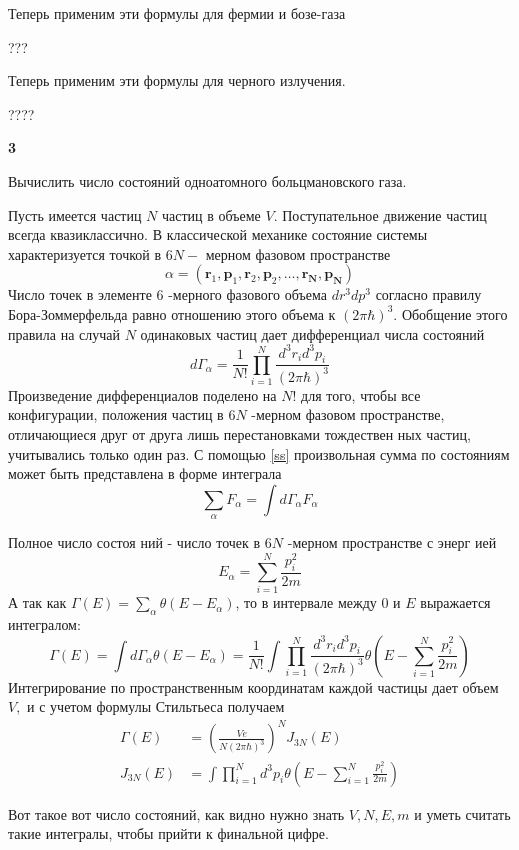 \documentclass[a4paper,12pt]{article} %
\begin{document}
\begin{task}
Теперь применим эти формулы для фермии и бозе-газа 



???

Теперь применим эти формулы для черного излучения.


????


\end{task}


\begin{task}\textbf{3}

Вычислить число состояний одноатомного больцмановского газа.

Пусть имеется частиц $N$ частиц в объеме $V$. 
Поступательное движение частиц всегда квазиклассично. 
В классической механике состояние системы характеризуется точкой в $6 N-$ мерном фазовом пространстве
\begin{equation}\label{ss}
\alpha=
\left(\mathbf{r}_{1}, \mathbf{p}_{1}, \mathbf{r}_{2}, \mathbf{p}_{2}, \ldots, \mathbf{r}_{\mathbf{N}}, \mathbf{p}_{\mathbf{N}}\right)
\end{equation}
Число точек в элементе 6 -мерного фазового объема $d r^{3} d p^{3}$ согласно правилу Бора-Зоммерфельда равно отношению этого объема к $(2 \pi \hbar)^{3} .$ 
Обобщение этого правила на случай $N$ одинаковых частиц дает дифференциал числа состояний
$$
d \Gamma_{\alpha}=\frac{1}{N !} \prod_{i=1}^{N} \frac{d^{3} r_{i} d^{3} p_{i}}{(2 \pi \hbar)^{3}}
$$
Произведение дифференциалов поделено на $N !$ для того, чтобы все конфигурации, положения частиц в $6 N$ -мерном фазовом пространстве, 
отличающиеся друг от друга лишь перестановками тождествен ных частиц, учитывались только один раз. 
С помощью \ref{ss} произвольная сумма по состояниям может быть представлена в форме интеграла
$$
\sum_{\alpha} F_{\alpha}=\int d \Gamma_{\alpha} F_{\alpha}
$$


Полное число состоя ний - число точек в $6 N$ -мерном пространстве с энерг ией
$$
E_{\alpha}=\sum_{i=1}^{N} \frac{p_{i}^{2}}{2 m}
$$
А так как $ \Gamma(E)=\sum_{\alpha} \theta\left(E-E_{\alpha}\right)$, то в интервале между 0 и $E$ выражается интегралом:
$$
\Gamma(E)=\int d \Gamma_{\alpha} \theta\left(E-E_{\alpha}\right)=\frac{1}{N !} \int \prod_{i=1}^{N} \frac{d^{3} r_{i} d^{3} p_{i}}{(2 \pi \hbar)^{3}} \theta\left(E-\sum_{i=1}^{N} \frac{p_{i}^{2}}{2 m}\right)
$$
Интегрирование по пространственным координатам каждой частицы дает объем $V,$ и с учетом формулы Стильтьеса получаем
$$
\begin{aligned}
\Gamma(E) &=\left(\frac{V e}{N(2 \pi \hbar)^{3}}\right)^{N} J_{3 N}(E) \\
J_{3 N}(E) &=\int \prod_{i=1}^{N} d^{3} p_{i} \theta\left(E-\sum_{i=1}^{N} \frac{p_{i}^{2}}{2 m}\right)
\end{aligned}
$$

Вот такое вот число состояний, как видно нужно знать $ V, N,E, m$ и уметь считать такие интегралы, чтобы прийти к финальной цифре.


\end{task}
\end{document}
